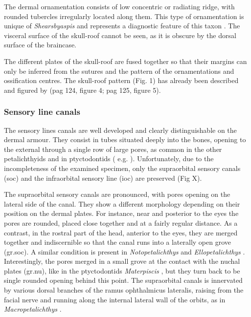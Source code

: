 \documentclass[12pt,letterpaper]{article}
\begin{document}
The dermal ornamentation consists of low concentric or radiating ridge, with rounded tubercles irregularly located along them. This type of ornamentation is unique of \textit{Shearsbyaspis} and represents a diagnostic feature of this taxon \citep{Young1985}. The visceral surface of the skull-roof cannot be seen, as it is obscure by the dorsal surface of the braincase.

The different plates of the skull-roof are fused together so that their margins can only be inferred from the sutures and the pattern of the ornamentations and ossification centres. The skull-roof pattern (Fig. 1) has already been described and figured by \cite{Young1985} (pag 124, figure 4; pag 125, figure 5).

\subsubsection{Sensory line canals}

The sensory lines canals are well developed and clearly distinguishable on the dermal armour. They consist in tubes situated deeply into the bones, opening to the external through a single row of large pores, as common in the other petalichthyids and in ptyctodontids ( e.g. \citealt{Stensi1925,Miles1967,Denison1978,Young1978,Young1985,Forey1986a,Zhu1991,Trinajstic2012,pan2015new}). Unfortunately, due to the incompleteness of the examined specimen, only the supraorbital sensory canals (soc) and the infraorbital sensory line (ioc) are preserved (Fig X).

The supraorbital sensory canals are pronounced, with pores opening on the lateral side of the canal. They show a different morphology depending on their position on the dermal plates. For instance, near and posterior to the eyes the pores are rounded, placed close together and at a fairly regular distance. As a contrast, in the rostral part of the head, anterior to the eyes, they are merged together and indiscernible so that the canal runs into a laterally open grove (gr.soc). A similar condition is present in \textit{Notopetalichthys} \cite{Woodward1941} and \textit{Ellopetalichthys} \cite{Ørvig1957}. Interestingly, the pores merged in a small grove at the contact with the nuchal plates (gr.nu), like in the ptyctodontids \textit{Materpiscis} \cite{Trinajstic2012}, but they turn back to be single rounded opening behind this point. The supraorbital canals is innervated by various dorsal branches of the ramus ophthalmicus lateralis, raising from the facial nerve and running along the internal lateral wall of the orbits, as in \textit{Macropetalichthys} \cite{Stensi1925,Stensi1963b,Stensi1969}.
\end{document}
